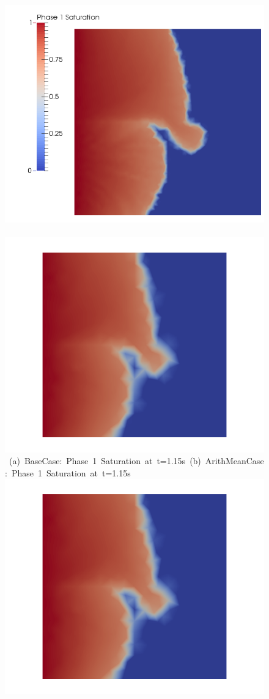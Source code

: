 \begin{landscape}
\begin{figure}[ht] 
\vbox{\vspace{-1cm}
\hbox{\hspace{4cm} \includegraphics[width=.56\textwidth]{./Pics/BaseCase/BaseCase_Saturation_t_1dot15withlegend.png}
      \hspace {1.5cm} \includegraphics[width=.56\textwidth]{./Pics/ArithMeanCase/ArithMeanCase_Saturation_t_1dot15.png}}
\vspace{0.cm}
\hbox{\hspace{3.75cm} (a) BaseCase: Phase 1 Saturation at t=1.15s \hspace{1cm} (b) ArithMeanCase: Phase 1 Saturation at t=1.15s}
\vspace{0.5cm}
\hbox{
      \includegraphics[width=.56\textwidth]{./Pics/HarmMeanCase/HarmMeanCase_Saturation_t_1dot15.png}
}}
\end{figure}
\end{landscape}
